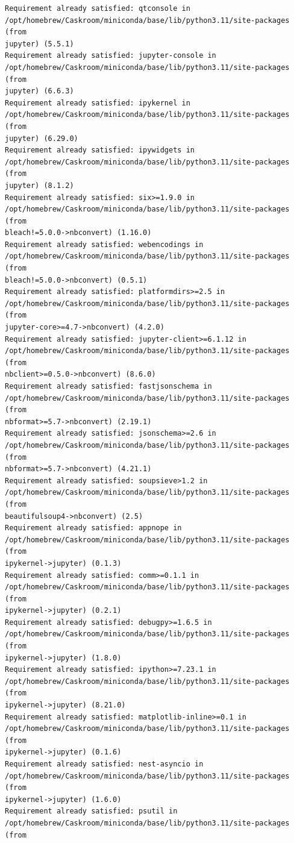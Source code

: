 \documentclass[11pt]{article}
\begin{document}
\begin{Verbatim}[commandchars=\\\{\}]
Requirement already satisfied: qtconsole in
/opt/homebrew/Caskroom/miniconda/base/lib/python3.11/site-packages (from
jupyter) (5.5.1)
Requirement already satisfied: jupyter-console in
/opt/homebrew/Caskroom/miniconda/base/lib/python3.11/site-packages (from
jupyter) (6.6.3)
Requirement already satisfied: ipykernel in
/opt/homebrew/Caskroom/miniconda/base/lib/python3.11/site-packages (from
jupyter) (6.29.0)
Requirement already satisfied: ipywidgets in
/opt/homebrew/Caskroom/miniconda/base/lib/python3.11/site-packages (from
jupyter) (8.1.2)
Requirement already satisfied: six>=1.9.0 in
/opt/homebrew/Caskroom/miniconda/base/lib/python3.11/site-packages (from
bleach!=5.0.0->nbconvert) (1.16.0)
Requirement already satisfied: webencodings in
/opt/homebrew/Caskroom/miniconda/base/lib/python3.11/site-packages (from
bleach!=5.0.0->nbconvert) (0.5.1)
Requirement already satisfied: platformdirs>=2.5 in
/opt/homebrew/Caskroom/miniconda/base/lib/python3.11/site-packages (from
jupyter-core>=4.7->nbconvert) (4.2.0)
Requirement already satisfied: jupyter-client>=6.1.12 in
/opt/homebrew/Caskroom/miniconda/base/lib/python3.11/site-packages (from
nbclient>=0.5.0->nbconvert) (8.6.0)
Requirement already satisfied: fastjsonschema in
/opt/homebrew/Caskroom/miniconda/base/lib/python3.11/site-packages (from
nbformat>=5.7->nbconvert) (2.19.1)
Requirement already satisfied: jsonschema>=2.6 in
/opt/homebrew/Caskroom/miniconda/base/lib/python3.11/site-packages (from
nbformat>=5.7->nbconvert) (4.21.1)
Requirement already satisfied: soupsieve>1.2 in
/opt/homebrew/Caskroom/miniconda/base/lib/python3.11/site-packages (from
beautifulsoup4->nbconvert) (2.5)
Requirement already satisfied: appnope in
/opt/homebrew/Caskroom/miniconda/base/lib/python3.11/site-packages (from
ipykernel->jupyter) (0.1.3)
Requirement already satisfied: comm>=0.1.1 in
/opt/homebrew/Caskroom/miniconda/base/lib/python3.11/site-packages (from
ipykernel->jupyter) (0.2.1)
Requirement already satisfied: debugpy>=1.6.5 in
/opt/homebrew/Caskroom/miniconda/base/lib/python3.11/site-packages (from
ipykernel->jupyter) (1.8.0)
Requirement already satisfied: ipython>=7.23.1 in
/opt/homebrew/Caskroom/miniconda/base/lib/python3.11/site-packages (from
ipykernel->jupyter) (8.21.0)
Requirement already satisfied: matplotlib-inline>=0.1 in
/opt/homebrew/Caskroom/miniconda/base/lib/python3.11/site-packages (from
ipykernel->jupyter) (0.1.6)
Requirement already satisfied: nest-asyncio in
/opt/homebrew/Caskroom/miniconda/base/lib/python3.11/site-packages (from
ipykernel->jupyter) (1.6.0)
Requirement already satisfied: psutil in
/opt/homebrew/Caskroom/miniconda/base/lib/python3.11/site-packages (from

\end{Verbatim}
\end{document}
